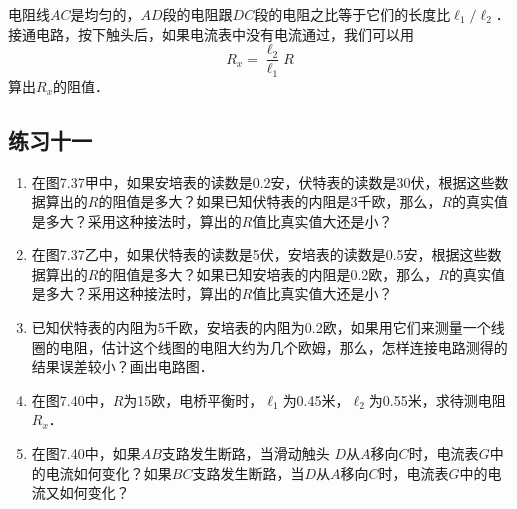 电阻线$AC$是均匀的，$AD$段的电阻跟$DC$段的电阻之比等于它们的长度比$\ell_1/\ell_2$．接通电路，按下触头后，如果电流表中没有电流通过，我们可以用
\[R_x=\frac{\ell_2}{\ell_1}R\]
算出$R_x$的阻值．

\subsection*{练习十一}
\begin{enumerate}
    \item 在图7.37甲中，如果安培表的读数是0.2安，伏特表的读数是30伏，根据这些数据算出的$R$的阻值是多大？如果已知伏特表的内阻是3千欧，那么，$R$的真实值是多大？采用这种接法时，算出的$R$值比真实值大还是小？
    \item 在图7.37乙中，如果伏特表的读数是5伏，安培表的读数是0.5安，根据这些数据算出的$R$的阻值是多大？如果已知安培表的内阻是0.2欧，那么，$R$的真实值是多大？采用这种接法时，算出的$R$值比真实值大还是小？
    \item 已知伏特表的内阻为5千欧，安培表的内阻为0.2欧，如果用它们来测量一个线圈的电阻，估计这个线图的电阻大约为几个欧姆，那么，怎样连接电路测得的结果误差较小？画出电路图．
    \item 在图7.40中，$R$为15欧，电桥平衡时，$\ell_1$为0.45米，$\ell_2$为0.55米，求待测电阻$R_x$．
    \item 在图7.40中，如果$AB$支路发生断路，当滑动触头
    $D$从$A$移向$C$时，电流表$G$中的电流如何变化？如果$BC$支路发生断路，当$D$从$A$移向$C$时，电流表$G$中的电流又如何变化？
\end{enumerate}

